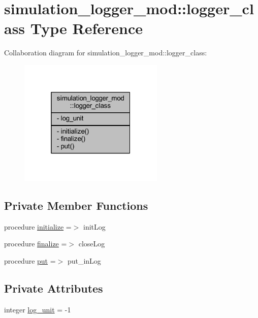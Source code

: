 \hypertarget{structsimulation__logger__mod_1_1logger__class}{}\section{simulation\+\_\+logger\+\_\+mod\+:\+:logger\+\_\+class Type Reference}
\label{structsimulation__logger__mod_1_1logger__class}


Collaboration diagram for simulation\+\_\+logger\+\_\+mod\+:\+:logger\+\_\+class\+:\nopagebreak
\begin{figure}[H]
\begin{center}
\leavevmode
\includegraphics[width=196pt]{structsimulation__logger__mod_1_1logger__class__coll__graph}
\end{center}
\end{figure}
\subsection*{Private Member Functions}
\begin{DoxyCompactItemize}
\item 
procedure \mbox{\hyperlink{structsimulation__logger__mod_1_1logger__class_ade4c1c34641ac20778c7d4f1e2e1cd81}{initialize}} =$>$ init\+Log
\item 
procedure \mbox{\hyperlink{structsimulation__logger__mod_1_1logger__class_a46fc11fd1e42d174205e06a05c223489}{finalize}} =$>$ close\+Log
\item 
procedure \mbox{\hyperlink{structsimulation__logger__mod_1_1logger__class_ae99085dc817bbb52855ab4bbd71d1a57}{put}} =$>$ put\+\_\+in\+Log
\end{DoxyCompactItemize}
\subsection*{Private Attributes}
\begin{DoxyCompactItemize}
\item 
integer \mbox{\hyperlink{structsimulation__logger__mod_1_1logger__class_a6b7412c0a809c5c2e63edd967d1d2f11}{log\+\_\+unit}} = -\/1
\end{DoxyCompactItemize}


